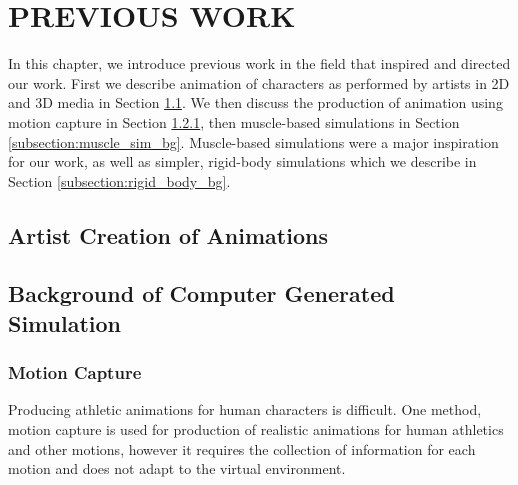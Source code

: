 
 
\chapter{PREVIOUS WORK}
\label{chapter:previous_work}
In this chapter, we introduce previous work in the field that inspired and directed our work.  First we describe animation of characters as performed by artists in 2D and 3D media in Section \ref{section:animation_bg}. We then discuss the production of animation using motion capture in Section \ref{subsection:mocap_bg}, then muscle-based simulations in Section \ref{subsection:muscle_sim_bg}.  Muscle-based simulations were a major inspiration for our work, as well as simpler, rigid-body simulations which we describe in Section \ref{subsection:rigid_body_bg}.

\section{Artist Creation of Animations}
\label{section:animation_bg}

\section{Background of Computer Generated Simulation}
\label{section:computer_gen_bg}
\subsection{Motion Capture}
\label{subsection:mocap_bg}
Producing athletic animations for human characters is difficult.  One method, motion capture is used for production of realistic animations for human athletics and other motions, however it requires the collection of information for each motion and does not adapt to the virtual environment.  

